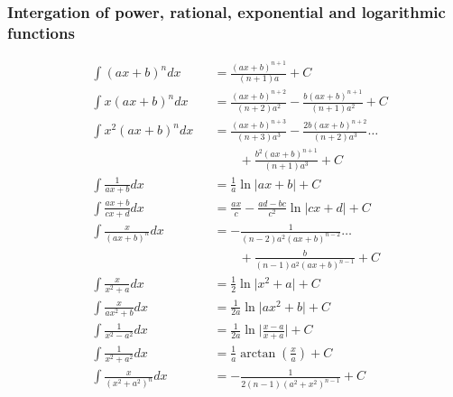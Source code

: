 \subsubsection{Intergation of power, rational, exponential and logarithmic functions}
\noindent
\begin{footnotesize}
    \begin{align*}
         & \int {(ax+b)}^n dx                    &  & =\frac{{(ax+b)}^{n+1}}{(n+1)a}+C                                                  \\
         & \int x{(ax+b)}^n dx                   &  & =\frac{{(ax+b)}^{n+2}}{(n+2)a^2}-\frac{b{(ax+b)}^{n+1}}{(n+1)a^2}+C               \\
         & \int x^2{(ax+b)}^n dx                 &  & =\frac{{(ax+b)}^{n+3}}{(n+3)a^3}-\frac{2b{(ax+b)}^{n+2}}{(n+2)a^3} \dots          \\
         &                                       &  & \qquad +\frac{b^2{(ax+b)}^{n+1}}{(n+1)a^3}+C                                      \\
         & \int \frac{1}{ax+b}dx                 &  & =\frac{1}{a}\ln\vert ax+b \vert +C                                                \\
         & \int \frac{ax+b}{cx+d}dx              &  & =\frac{ax}{c}-\frac{ad-bc}{c^2}\ln\vert cx+d \vert +C                             \\
         & \int \frac{x}{{(ax+b)}^n}dx           &  & =-\frac{1}{(n-2)a^2{(ax+b)}^{n-2}} \dots                                          \\
         &                                       &  & \qquad +\frac{b}{(n-1)a^2{(ax+b)}^{n-1}}+C                                        \\
         & \int \frac{x}{x^2+a}dx                &  & =\frac{1}{2}\ln\vert x^2+a \vert+C                                                \\
         & \int \frac{x}{ax^2+b}dx               &  & =\frac{1}{2a}\ln \vert ax^2+b \vert+C                                             \\
         & \int \frac{1}{x^2-a^2}dx              &  & =\frac{1}{2a}\ln \vert \frac{x-a}{x+a}\vert+C                                     \\
         & \int \frac{1}{x^2+a^2}dx              &  & =\frac{1}{a}\arctan(\frac{x}{a})+C                                                \\
         & \int \frac{x}{{(x^2+a^2)}^n}dx        &  & =-\frac{1}{2(n-1){(a^2+x^2)}^{n-1}}+C                                             \\

\end{align*}
\end{footnotesize}
